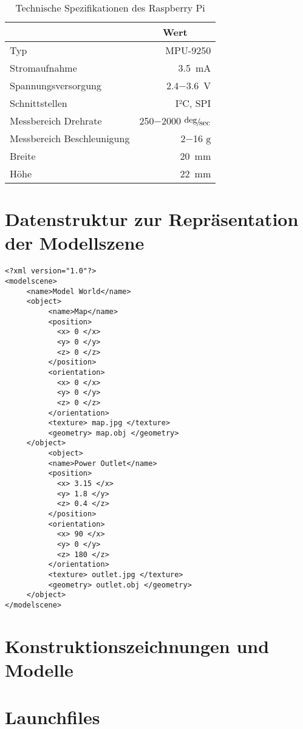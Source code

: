 \begin{table}[ht]
\caption{Technische Spezifikationen des Raspberry Pi}
\begin{center}
\begin{tabular}{|l|r|}
\hline
\rowcolor{lightgray} \multicolumn{1}{|c|}{\textbf{Spezifikation}} & \multicolumn{1}{|c|}{\textbf{Wert}}\\
\hline
Typ & MPU-9250 \\
\hline
Stromaufnahme & \SI{3,5}{\milli\ampere} \\
\hline
Spannungsversorgung & \SI{2,4}{}$-$\SI{3,6}{\volt} \\
\hline
Schnittstellen & I²C, SPI \\
\hline
Messbereich Drehrate & \SI{250}{}$-$\SI{2000}{} $\nicefrac{\deg}{\sec}$\\
\hline
Messbereich Beschleunigung &  \SI{2}{}$-$\SI{16}{} $\mathrm{g}$\\
\hline
Breite & \SI{20}{\milli\meter} \\
\hline
Höhe & \SI{22}{\milli\meter}\\
\hline
\end{tabular}
\end{center}
\label{tab:raspberry}
\end{table}

\clearpage{}

\section{Datenstruktur zur Repräsentation der Modellszene}
\label{app.datastructure}
\begin{lstlisting}[label=source.data,caption=Datenstruktur zur Repräsentation der Modellszene]
<?xml version="1.0"?>
<modelscene>
     <name>Model World</name>
     <object>
          <name>Map</name>
          <position>
          	<x> 0 </x>
          	<y> 0 </y>
          	<z> 0 </z>
          </position>
          <orientation>
          	<x> 0 </x>
          	<y> 0 </y>
          	<z> 0 </z>
          </orientation>
          <texture> map.jpg </texture>
          <geometry> map.obj </geometry>
     </object>
          <object>
          <name>Power Outlet</name>
          <position>
          	<x> 3.15 </x>
          	<y> 1.8 </y>
          	<z> 0.4 </z>
          </position>
          <orientation>
          	<x> 90 </x>
          	<y> 0 </y>
          	<z> 180 </z>
          </orientation>
          <texture> outlet.jpg </texture>
          <geometry> outlet.obj </geometry>
     </object>
</modelscene>
\end{lstlisting}

\clearpage{}

%

\section{Konstruktionszeichnungen und Modelle}
\label{app:construction}

\clearpage{}

\section{Launchfiles}
\label{app:launchfiles}